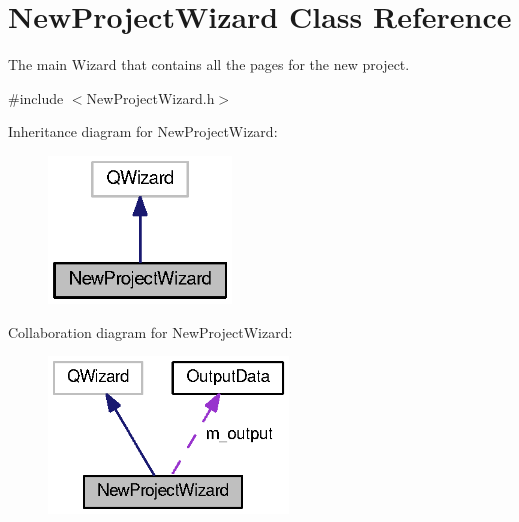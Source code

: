 \section{New\-Project\-Wizard Class Reference}
\label{class_new_project_wizard}


The main Wizard that contains all the pages for the new project.  




{\ttfamily \#include $<$New\-Project\-Wizard.\-h$>$}



Inheritance diagram for New\-Project\-Wizard\-:\nopagebreak
\begin{figure}[H]
\begin{center}
\leavevmode
\includegraphics[width=138pt]{class_new_project_wizard__inherit__graph}
\end{center}
\end{figure}


Collaboration diagram for New\-Project\-Wizard\-:\nopagebreak
\begin{figure}[H]
\begin{center}
\leavevmode
\includegraphics[width=181pt]{class_new_project_wizard__coll__graph}
\end{center}
\end{figure}
